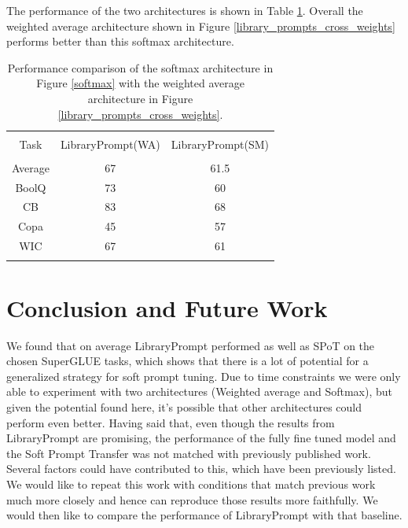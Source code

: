 \documentclass[final,6p,times,twocolumn,authoryear]{elsarticle}
\begin{document}
The performance of the two architectures is shown in Table \ref{wa_vs_softmax}. Overall the weighted average architecture shown in Figure \ref{library_prompts_cross_weights} performs better than this softmax architecture.

\begin{table}[!htbp]
    \centering 
    \begin{tabular}{c c c} 
        \\[-1.8ex]\hline 
        \hline \\
        Task & LibraryPrompt(WA) & LibraryPrompt(SM) \\ 
        \hline \\[-1.8ex] 
    Average & 67 & 61.5 \\
    BoolQ & 73 & 60 \\
    CB & 83 & 68 \\
    Copa & 45 & 57 \\
    WIC & 67 & 61 \\  
    \hline 
    \hline \\[-1.8ex] 
    \end{tabular}
    \caption{Performance comparison of the softmax architecture in Figure \ref{softmax} with the weighted average architecture in Figure \ref{library_prompts_cross_weights}.}
    \label{wa_vs_softmax} 
\end{table} 


\section{Conclusion and Future Work}
We found that on average LibraryPrompt performed as well as SPoT on the chosen SuperGLUE tasks, which shows that there is a lot of potential for a generalized strategy for soft prompt tuning. Due to time constraints we were only able to experiment with two architectures (Weighted average and Softmax), but given the potential found here, it’s possible that other architectures could perform even better.
Having said that, even though the results from LibraryPrompt are promising, the performance of the fully fine tuned model and the Soft Prompt Transfer was not matched with previously published work. Several factors could have contributed to this, which have been previously listed. We would like to repeat this work with conditions that match previous work much more closely and hence can reproduce those results more faithfully. We would then like to compare the performance of LibraryPrompt with that baseline.

\appendix
 

\end{document}
